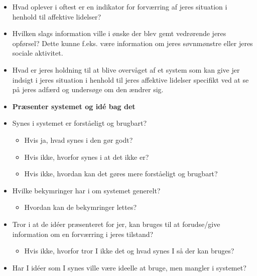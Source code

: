 \begin{itemize}
\item Hvad oplever i oftest er en indikator for forværring af jeres situation i henhold til affektive lidelser?
\item Hvilken slags information ville i ønske der blev gemt vedrørende jeres opførsel? Dette kunne f.eks. være information om jeres søvnmønstre eller jeres sociale aktivitet.
\item Hvad er jeres holdning til at blive overvåget af et system som kan give jer indsigt i jeres situation i henhold til jeres affektive lidelser specifikt ved at se på jeres adfærd og undersøge om den ændrer sig.
\item \textbf{Præsenter systemet og idé bag det}
\item Synes i systemet er forståeligt og brugbart?
	   \begin{itemize}
	   \item Hvis ja, hvad synes i den gør godt?
	   \item Hvis ikke, hvorfor synes i at det ikke er?
	   \item Hvis ikke, hvordan kan det gøres mere forståeligt og brugbart?
	   \end{itemize}
\item Hvilke bekymringer har i om systemet generelt?
	  \begin{itemize}
	  \item Hvordan kan de bekymringer lettes?
	  \end{itemize}
\item Tror i at de idéer præsenteret for jer, kan bruges til at forudse/give information om en forværring i jeres tilstand?
	   \begin{itemize}
	   \item Hvis ikke, hvorfor tror I ikke det og hvad synes I så der kan bruges?
	   \end{itemize}
\item Har I idéer som I synes ville være ideelle at bruge, men mangler i systemet?
\end{itemize}